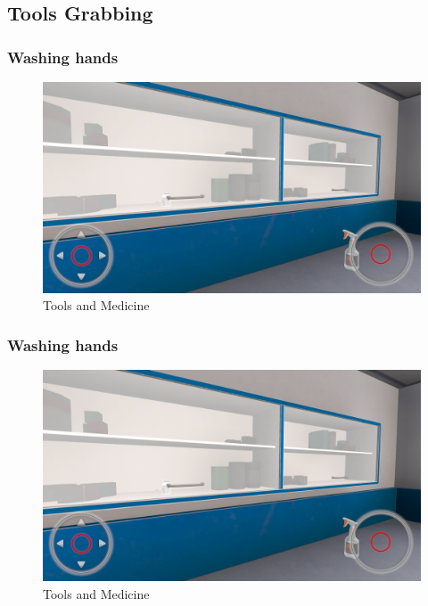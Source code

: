 \subsection{Tools Grabbing}
\subsubsection{Washing hands}
\begin{figure}[h]
	\centering
	\includegraphics[width=0.65\linewidth]{Images/Tools and Medicine.png}
	\caption{Tools and Medicine}
	\label{fig:system-diagram}
\end{figure}

\subsubsection{Washing hands}
\begin{figure}[h]
	\centering
	\includegraphics[width=0.65\linewidth]{Images/Tools and Medicine.png}
	\caption{Tools and Medicine}
	\label{fig:system-diagram}
\end{figure}

